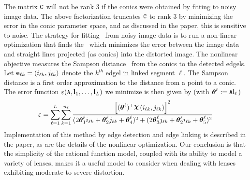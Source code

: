 \documentclass[extendedabs]{bmvc2k}
\begin{document}
The matrix $\mbox{\tt C}$ will not be rank 3 if the conics were obtained by
fitting to noisy image data.  The above factorization truncates $\mbox{\tt C}$
to rank 3 by minimizing the error in the conic parameter space, and as
discussed in the paper, this is sensitive to noise.  The strategy for
fitting \A\ from noisy image data is to run a non-linear optimization that
finds the \A\ which minimizes the error between the image data and straight
lines projected (as conics) into the distorted image.  The nonlinear
objective measures the Sampson distance~\cite{Hartley00} from the conics to
the detected edgels.  Let ${\bf e}_{\ell k} = (i_{\ell k},j_{\ell k})$
denote the $k^{th}$ edgel in linked segment $\ell$. The Sampson distance is
a first order approximation to the distance from a point to a conic. The
error function $\varepsilon(\mbox{\tt A}, {\bf l}_1, \ldots, {\bf l}_L)$ we
minimize is then given by (with ${\boldsymbol\theta}^\ell := \mbox{\tt A} {\bf l}_\ell$)
\begin{equation}
\def\t#1{\conic^\ell_{#1}}
\varepsilon =
\sum_{\ell = 1}^{L} \sum_{k=1}^{n_\ell }
\frac
{\left[(\conic^\ell)\tr\Chi\left(i_{\ell k},j_{\ell k}\right)\right]^2}
{(2\t1 i_{\ell k} + \t2 j_{\ell k} + \t4)^2 + (2\t3 j_{\ell k} +
\t2 i_{\ell k} + \t5)^2}
\nonumber
\end{equation}
Implementation of this method by edge detection and edge linking is
described in the paper, as are the details of the nonlinear optimization.
Our conclusion is that the simplicity of the rational function model,
coupled with its ability to model a variety of lenses, makes it a useful
model to consider when dealing with lenses exhibiting moderate to severe
distortion.

\newpage

\end{document}
